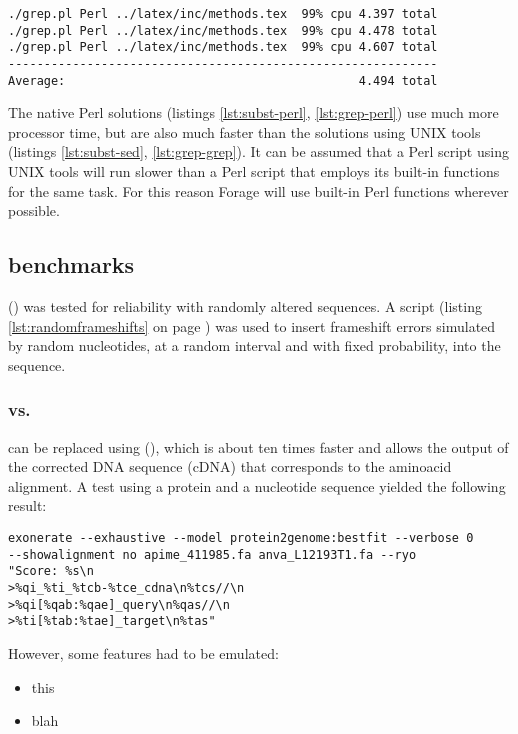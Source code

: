 \begin{verbatim}
./grep.pl Perl ../latex/inc/methods.tex  99% cpu 4.397 total
./grep.pl Perl ../latex/inc/methods.tex  99% cpu 4.478 total
./grep.pl Perl ../latex/inc/methods.tex  99% cpu 4.607 total
------------------------------------------------------------
Average:                                         4.494 total
\end{verbatim}

The native Perl solutions (listings \ref{lst:subst-perl}, \ref{lst:grep-perl}) use much more processor time, but are also much faster than the solutions using UNIX tools (listings \ref{lst:subst-sed}, \ref{lst:grep-grep}). It can be assumed that a Perl script using UNIX tools will run slower than a Perl script that employs its built-in functions for the same task. For this reason Forage will use built-in Perl functions wherever possible.

\subsection{ benchmarks}
 (\cite{Birney2004}) was tested for reliability with randomly altered sequences. A script (listing \ref{lst:randomframeshifts} on page \pageref{lst:randomframeshifts}) was used to insert frameshift errors simulated by random nucleotides, at a random interval and with fixed probability, into the sequence. 

\subsubsection{ vs. }
 can be replaced using  (\cite{Slater2005}), which is about ten times faster and allows the output of the corrected DNA sequence (cDNA) that corresponds to the aminoacid alignment. A test using a protein and a nucleotide sequence yielded the following result:
\begin{verbatim}
exonerate --exhaustive --model protein2genome:bestfit --verbose 0 
--showalignment no apime_411985.fa anva_L12193T1.fa --ryo 
"Score: %s\n
>%qi_%ti_%tcb-%tce_cdna\n%tcs//\n
>%qi[%qab:%qae]_query\n%qas//\n
>%ti[%tab:%tae]_target\n%tas" 
\end{verbatim}

However, some features had to be emulated: 
\begin{itemize}
\item this
\item blah
\end{itemize}
